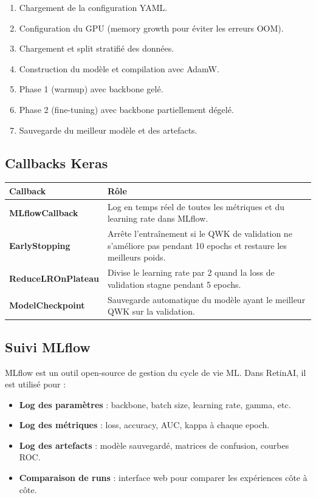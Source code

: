 \documentclass[11pt,a4paper]{article}
\begin{document}
\begin{enumerate}[leftmargin=2em]
  \item Chargement de la configuration YAML.
  \item Configuration du GPU (memory growth pour éviter les erreurs OOM).
  \item Chargement et split stratifié des données.
  \item Construction du modèle et compilation avec AdamW.
  \item Phase 1 (warmup) avec backbone gelé.
  \item Phase 2 (fine-tuning) avec backbone partiellement dégelé.
  \item Sauvegarde du meilleur modèle et des artefacts.
\end{enumerate}

\subsection{Callbacks Keras}

\begin{center}
\renewcommand{\arraystretch}{1.4}
\begin{tabularx}{\textwidth}{>{\bfseries}lX}
\toprule
Callback & Rôle \\
\midrule
MLflowCallback & Log en temps réel de toutes les métriques et du learning rate dans MLflow. \\
EarlyStopping & Arrête l'entraînement si le QWK de validation ne s'améliore pas pendant 10 epochs et restaure les meilleurs poids. \\
ReduceLROnPlateau & Divise le learning rate par 2 quand la loss de validation stagne pendant 5 epochs. \\
ModelCheckpoint & Sauvegarde automatique du modèle ayant le meilleur QWK sur la validation. \\
\bottomrule
\end{tabularx}
\end{center}

\subsection{Suivi MLflow}

MLflow est un outil open-source de gestion du cycle de vie ML. Dans RetinAI, il est utilisé pour :

\begin{itemize}[leftmargin=2em]
  \item \textbf{Log des paramètres} : backbone, batch size, learning rate, gamma, etc.
  \item \textbf{Log des métriques} : loss, accuracy, AUC, kappa à chaque epoch.
  \item \textbf{Log des artefacts} : modèle sauvegardé, matrices de confusion, courbes ROC.
  \item \textbf{Comparaison de runs} : interface web pour comparer les expériences côte à côte.
\end{itemize}
\end{document}
